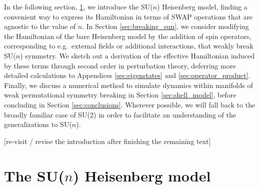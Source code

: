 \documentclass[nofootinbib,notitlepage,11pt]{revtex4-2}
\newcommand{\1}{\mathds{1}}
\newcommand{\red}[1]{{\color{red} #1}}
\begin{document}
In the following section, \ref{sec:bare_sun}, we introduce the SU($n$)
Heisenberg model, finding a convenient way to express its Hamiltonian
in terms of SWAP operations that are agnostic to the value of $n$.  In
Section \ref{sec:breaking_sun}, we consider modifying the Hamiltonian
of the bare Heisenberg model by the addition of spin operators,
corresponding to e.g.~external fields or additional interactions, that
weakly break SU($n$) symmetry.  We sketch out a derivation of the
effective Hamiltonian induced by these terms through second order in
perturbation theory, deferring more detailed calculations to
Appendices \ref{sec:eigenstates} and \ref{sec:operator_product}.
Finally, we discuss a numerical method to simulate dynamics within
manifolds of weak permutational symmetry breaking in Section
\ref{sec:shell_model}, before concluding in Section
\ref{sec:conclusions}.  Wherever possible, we will fall back to the
broadly familiar case of SU(2) in order to facilitate an understanding
of the generalizations to SU($n$).

\red{[re-visit / revise the introduction after finishing the remaining
  text]}

\section{The SU($n$) Heisenberg model}
\label{sec:bare_sun}
\end{document}
